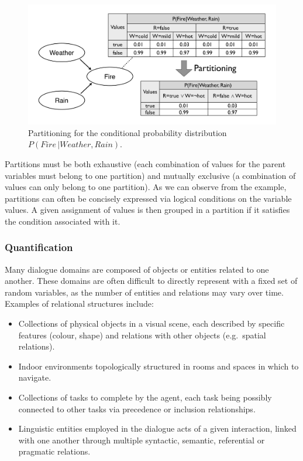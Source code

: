 

 \begin{figure}[ht]
\centering
\includegraphics[scale=0.25]{imgs/partitioning.pdf}
\caption{Partitioning for the conditional probability distribution $P(\mathit{Fire} \, | \mathit{Weather}, \mathit{Rain})$.}
\label{fig:partitioning}
\end{figure}

Partitions must be both exhaustive (each combination of values for the parent variables must belong to one partition) and mutually exclusive (a combination of values can only belong to one partition).  As we can observe from the example, partitions can often be concisely expressed via logical conditions on the variable values.  A given assignment of values is then grouped in a partition if it satisfies the condition associated with it. 

\subsubsection*{Quantification}

Many dialogue domains are composed of objects or entities related to one another. These domains are often difficult to directly represent with a fixed set of random variables, as the number of entities and relations may vary over time.  Examples of relational structures include: 
\begin{itemize}
\item Collections of physical objects in a visual scene, each described by specific features (colour, shape) and relations with other objects (e.g.\ spatial relations).
\item Indoor environments topologically structured in rooms and spaces in which to navigate. 
\item Collections of tasks to complete by the agent, each task being possibly connected to other tasks via precedence or inclusion relationships.
\item Linguistic entities employed in the dialogue acts of a given interaction, linked with one another through multiple syntactic, semantic, referential or pragmatic relations. 
\end{itemize}

